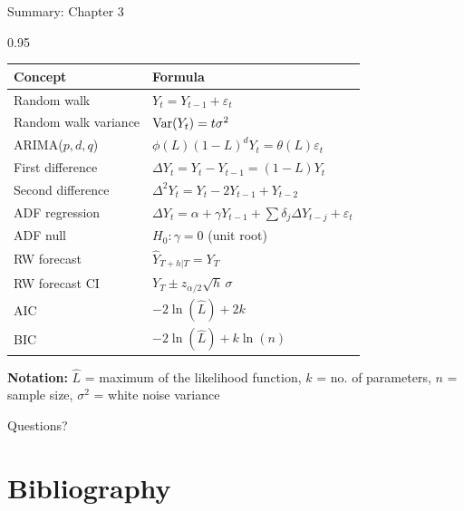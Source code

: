 \documentclass[9pt, aspectratio=169, t]{beamer}
\begin{document}
\begin{frame}{Summary: Chapter 3}
    \begin{cminipage}{0.95\textwidth}
    {\footnotesize
    \begin{center}
    \begin{tabular}{ll}
        \toprule
        \textbf{Concept} & \textbf{Formula} \\
        \midrule
        Random walk & $Y_t = Y_{t-1} + \varepsilon_t$ \\
        Random walk variance & $\text{Var}(Y_t) = t\sigma^2$ \\
        ARIMA($p,d,q$) & $\phi(L)(1-L)^d Y_t = \theta(L)\varepsilon_t$ \\
        First difference & $\Delta Y_t = Y_t - Y_{t-1} = (1-L)Y_t$ \\
        Second difference & $\Delta^2 Y_t = Y_t - 2Y_{t-1} + Y_{t-2}$ \\
        \midrule
        ADF regression & $\Delta Y_t = \alpha + \gamma Y_{t-1} + \sum \delta_j \Delta Y_{t-j} + \varepsilon_t$ \\
        ADF null & $H_0: \gamma = 0$ (unit root) \\
        \midrule
        RW forecast & $\hat{Y}_{T+h|T} = Y_T$ \\
        RW forecast CI & $Y_T \pm z_{\alpha/2}\sqrt{h}\,\sigma$ \\
        \midrule
        AIC & $-2\ln(\hat{L}) + 2k$ \\
        BIC & $-2\ln(\hat{L}) + k\ln(n)$ \\
        \bottomrule
    \end{tabular}
    \end{center}

    {\scriptsize \textbf{Notation:} $\hat{L}$ = maximum of the likelihood function, $k$ = no. of parameters, $n$ = sample size, $\sigma^2$ = white noise variance}
    }

    \vspace{0.2cm}
    \begin{center}
        \Large\textcolor{MainBlue}{Questions?}
    \end{center}
    \end{cminipage}
\end{frame}

\section{Bibliography}
\end{document}
